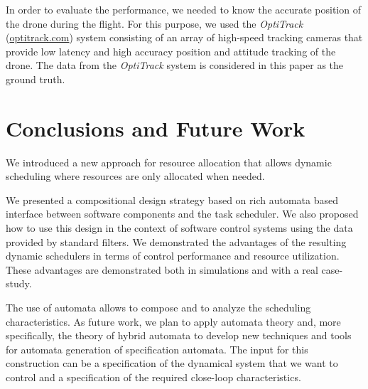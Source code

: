 \documentclass{sig-alternate-ipsn13}
\begin{document}
In order to evaluate the performance, we needed to know the accurate position of the drone during the flight. For this purpose, we used the \textit{OptiTrack} (\url{optitrack.com}) system 
consisting of an array of high-speed tracking cameras that provide low latency and high accuracy position and attitude tracking of the drone. The data from the \textit{OptiTrack} system is considered in this paper as the ground truth.

\section{Conclusions and Future Work}
We introduced a new approach for resource allocation that allows dynamic scheduling where resources are only allocated when needed.

We presented a compositional design strategy based on rich automata based interface between software components and the task scheduler. We also proposed how to use this design in the context of software control systems using the data provided by standard filters.
We demonstrated the advantages of the resulting dynamic schedulers in terms of control performance and resource utilization. These advantages are demonstrated both in simulations and with a real case-study.

The use of automata allows to compose and to analyze the scheduling characteristics. As future work, we plan to apply automata theory and, more specifically, the theory of hybrid automata to develop new techniques and tools for automata generation of specification automata. The input for this construction can be a specification of the dynamical system that we want to control and a specification of the required close-loop characteristics. 



%

%
%
%

\end{document}
